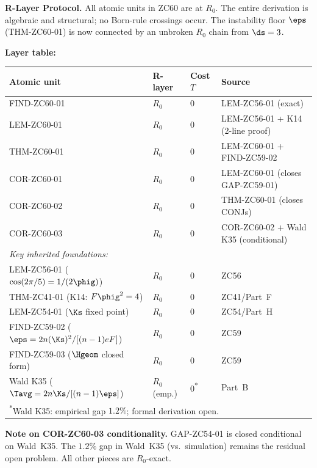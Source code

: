 \documentclass[12pt, a4paper]{article}
\begin{document}
\begin{layerbox}[title={R-Layer Assignments for ZC60}]
\textbf{R-Layer Protocol.}
All atomic units in ZC60 are at $R_0$.  The entire derivation
is algebraic and structural; no Born-rule crossings occur.
The instability floor $\eps$ (THM-ZC60-01) is now connected
by an unbroken $R_0$ chain from $\ds=3$.

\medskip
\textbf{Layer table:}
\begin{center}
{\small\renewcommand{\arraystretch}{1.25}
\begin{tabular}{@{}p{5.4cm}llp{4.4cm}@{}}
\toprule
Atomic unit & R-layer & Cost $T$ & Source \\
\midrule
FIND-ZC60-01 & $R_0$ & $0$ & LEM-ZC56-01 (exact) \\
LEM-ZC60-01  & $R_0$ & $0$ & LEM-ZC56-01 + K14 (2-line proof) \\
THM-ZC60-01  & $R_0$ & $0$ & LEM-ZC60-01 + FIND-ZC59-02 \\
COR-ZC60-01  & $R_0$ & $0$ & LEM-ZC60-01 (closes GAP-ZC59-01) \\
COR-ZC60-02  & $R_0$ & $0$ & THM-ZC60-01 (closes CONJs) \\
COR-ZC60-03  & $R_0$ & $0$ & COR-ZC60-02 + Wald K35 (conditional) \\
\midrule
\multicolumn{4}{l}{\textit{Key inherited foundations:}} \\
LEM-ZC56-01 ($\cos(2\pi/5)=1/(2\phig)$) & $R_0$ & $0$ & ZC56 \\
THM-ZC41-01 (K14: $F\phig^2=4$) & $R_0$ & $0$ & ZC41/Part~F \\
LEM-ZC54-01 ($\Ks$ fixed point) & $R_0$ & $0$ & ZC54/Part~H \\
FIND-ZC59-02 ($\eps=2n(\Ks)^2/[(n-1)eF]$) & $R_0$ & $0$ & ZC59 \\
FIND-ZC59-03 ($\Hgeom$ closed form) & $R_0$ & $0$ & ZC59 \\
Wald K35 ($\Tavg=2n\Ks/[(n-1)\eps]$) & $R_0$ (emp.) & $0$\textsuperscript{*} & Part~B \\
\midrule
\multicolumn{4}{l}{\textsuperscript{*}Wald K35: empirical gap $1.2\%$; formal derivation open.} \\
\bottomrule
\end{tabular}
}
\end{center}

\textbf{Note on COR-ZC60-03 conditionality.}
GAP-ZC54-01 is closed conditional on Wald~K35.  The $1.2\%$
gap in Wald~K35 (vs.~simulation) remains the residual
open problem.  All other pieces are $R_0$-exact.
\end{layerbox}
\end{document}

